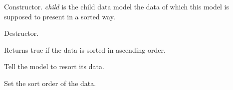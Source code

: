 
Constructor. {\it child} is the child data model the data of
which this model is supposed to present in a sorted way.

\label{wxdataviewsortedlistmodeldtor}


Destructor.

\label{wxdataviewsortedlistmodelgetascending}


Returns true if the data is sorted in ascending order.

\label{wxdataviewsortedlistmodelresort}


Tell the model to resort its data.

\label{wxdataviewsortedlistmodelsetascending}


Set the sort order of the data.

